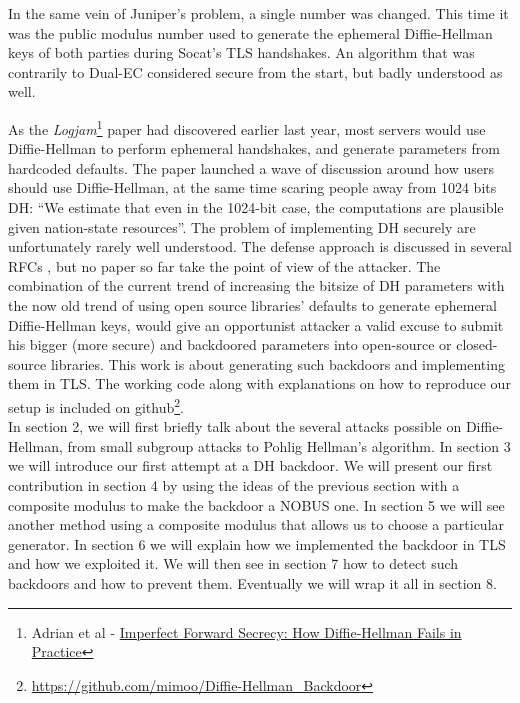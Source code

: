 \documentclass[a4paper,11pt,twocolumn]{article}
\begin{document}
In the same vein of Juniper's problem, a single number was changed. This time it was the public modulus number used to generate the ephemeral Diffie-Hellman keys of both parties during Socat's TLS handshakes. An algorithm that was contrarily to Dual-EC considered secure from the start, but badly understood as well.

As the \emph{Logjam}\footnote{Adrian et al - \href{https://weakdh.org/imperfect-forward-secrecy-ccs15.pdf}{Imperfect Forward Secrecy: How Diffie-Hellman Fails in Practice}}\cite{logjam} paper had discovered earlier last year, most servers would use Diffie-Hellman to perform ephemeral handshakes, and generate parameters from hardcoded defaults. The paper launched a wave of discussion around how users should use Diffie-Hellman, at the same time scaring people away from 1024 bits DH: ``We estimate that even in the 1024-bit case, the computations are plausible given nation-state resources''. The problem of implementing DH securely are unfortunately rarely well understood. The defense approach is discussed in several RFCs \cite{rfc2631} \cite{rfc2785}, but no paper so far take the point of view of the attacker. The combination of the current trend of increasing the bitsize of DH parameters with the now old trend of using open source libraries' defaults to generate ephemeral Diffie-Hellman keys, would give an opportunist attacker a valid excuse to submit his bigger (more secure) and backdoored parameters into open-source or closed-source libraries. This work is about generating such backdoors and implementing them in TLS. The working code along with explanations on how to reproduce our setup is included on github\footnote{\href{https://github.com/mimoo/Diffie-Hellman_Backdoor}{https://github.com/mimoo/Diffie-Hellman_Backdoor}}.\\

In section 2, we will first briefly talk about the several attacks possible on Diffie-Hellman, from small subgroup attacks to Pohlig Hellman's algorithm. In section 3 we will introduce our first attempt at a DH backdoor. We will present our first contribution in section 4 by using the ideas of the previous section with a composite modulus to make the backdoor a NOBUS one. In section 5 we will see another method using a composite modulus that allows us to choose a particular generator. In section 6 we will explain how we implemented the backdoor in TLS and how we exploited it. We will then see in section 7 how to detect such backdoors and how to prevent them. Eventually we will wrap it all in section 8.
\end{document}
